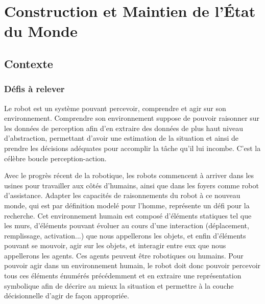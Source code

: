 \documentclass[a4paper,11pt,twoside]{StyleThese}
\begin{document}
\setcounter{chapter}{0} %
\dominitoc
\faketableofcontents
\fi

\chapter{Construction et Maintien de l'État du Monde}
\label{chapter1}
\minitoc


\section{Contexte}
\subsection{Défis à relever}
Le robot est un système pouvant percevoir, comprendre et agir sur son environnement. Comprendre son environnement suppose de pouvoir raisonner sur les données de perception afin d'en extraire des données de plus haut niveau d'abstraction, permettant d'avoir une estimation de la situation et ainsi de prendre les décisions adéquates pour accomplir la tâche qu'il lui incombe. C'est la célèbre boucle perception-action.

Avec le progrès récent de la robotique, les robots commencent à arriver dans les usines pour travailler aux côtés d'humains, ainsi que dans les foyers comme robot d'assistance. Adapter les capacités de raisonnements du robot à ce nouveau monde, qui est par définition modelé pour l'homme, représente un défi pour la recherche. Cet environnement humain est composé
d'éléments statiques tel que les murs, d'éléments pouvant évoluer au cours d'une interaction (déplacement, remplissage, activation...) que nous appellerons les objets, et enfin d'éléments pouvant se mouvoir, agir sur les objets, et interagir entre eux que nous appellerons les agents. Ces agents peuvent être robotiques ou humains.
Pour pouvoir agir dans un environnement humain, le robot doit donc pouvoir percevoir tous ces éléments énumérés précédemment et en extraire une représentation symbolique afin de décrire au mieux la situation et permettre à la couche décisionnelle d'agir de façon appropriée.


\end{document}
